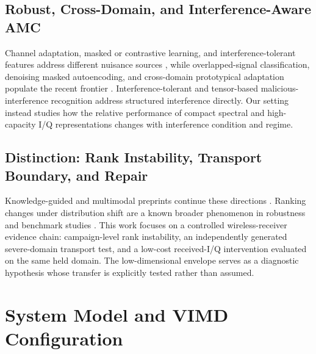 \documentclass[letterpaper,journal]{IEEEtran}
\begin{document}
\subsection{Robust, Cross-Domain, and Interference-Aware AMC}
Channel adaptation, masked or contrastive learning, and interference-tolerant
features address different nuisance sources
\cite{wang2024sigda,xiao2024mclhn,du2025contrastive,sun2025mfenet}, while
overlapped-signal classification, denoising masked autoencoding, and
cross-domain prototypical adaptation populate the recent frontier
\cite{jajoo2024overlapped,faysal2026denomae,li2026cgpcda}. Interference-tolerant
\cite{sun2025mfenet} and tensor-based malicious-interference
\cite{zhang2026malicious} recognition address structured interference
directly. Our setting instead studies how the relative performance of compact
spectral and high-capacity I/Q representations changes with interference
condition and regime.

\subsection{Distinction: Rank Instability, Transport Boundary, and Repair}
Knowledge-guided and multimodal preprints continue these directions
\cite{dkdnet2026preprint,moeformer2026preprint,zoomspec2026preprint,
rismae2025preprint}. Ranking changes under distribution shift are a known
broader phenomenon in robustness and benchmark studies
\cite{taori2020naturalshift,miller2021accuracyline,koh2021wilds}. This work focuses on a
controlled wireless-receiver evidence chain: campaign-level rank instability,
an independently generated severe-domain transport test, and a low-cost
received-I/Q intervention evaluated on the same held domain. The
low-dimensional envelope serves as a diagnostic hypothesis whose transfer is
explicitly tested rather than assumed.

\section{System Model and VIMD Configuration}
\end{document}
